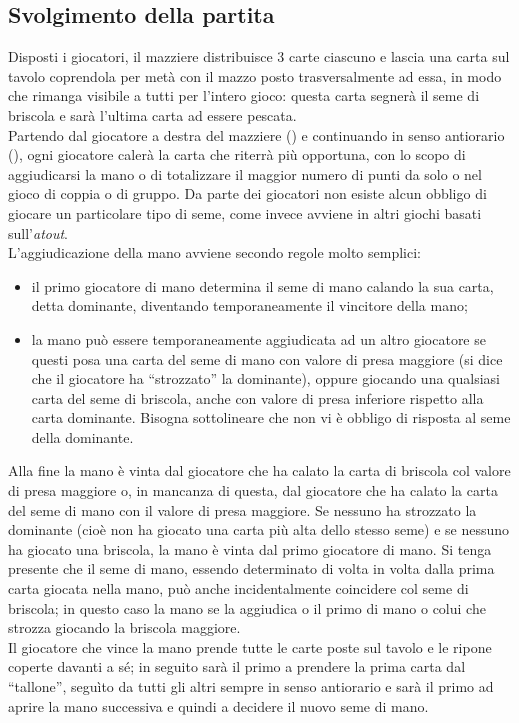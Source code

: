 \subsection{Svolgimento della partita}

Disposti i giocatori, il mazziere distribuisce 3 carte ciascuno e lascia una carta sul tavolo coprendola per metà con il mazzo posto trasversalmente ad essa, in modo che rimanga visibile a tutti per l'intero gioco: questa carta segnerà il seme di briscola e sarà l'ultima carta ad essere pescata.\\
Partendo dal giocatore a destra del mazziere (\cite{giochidicarte}) e continuando in senso antiorario (\cite{giochidicarte2}), ogni giocatore calerà la carta che riterrà più opportuna, con lo scopo di aggiudicarsi la mano o di totalizzare il maggior numero di punti da solo o nel gioco di coppia o di gruppo. Da parte dei giocatori non esiste alcun obbligo di giocare un particolare tipo di seme, come invece avviene in altri giochi basati sull'\emph{atout}.\\

L'aggiudicazione della mano avviene secondo regole molto semplici:

\begin{itemize}
   \item il primo giocatore di mano determina il seme di mano calando la sua carta, detta dominante, diventando temporaneamente il vincitore della mano;
   \item la mano può essere temporaneamente aggiudicata ad un altro giocatore se questi posa una carta del seme di mano con valore di presa maggiore (si dice che il giocatore ha ``strozzato'' la dominante), oppure giocando una qualsiasi carta del seme di briscola, anche con valore di presa inferiore rispetto alla carta dominante. Bisogna sottolineare che non vi è obbligo di risposta al seme della dominante.
\end{itemize}
Alla fine la mano è vinta dal giocatore che ha calato la carta di briscola col valore di presa maggiore o, in mancanza di questa, dal giocatore che ha calato la carta del seme di mano con il valore di presa maggiore. Se nessuno ha strozzato la dominante (cioè non ha giocato una carta più alta dello stesso seme) e se nessuno ha giocato una briscola, la mano è vinta dal primo giocatore di mano. Si tenga presente che il seme di mano, essendo determinato di volta in volta dalla prima carta giocata nella mano, può anche incidentalmente coincidere col seme di briscola; in questo caso la mano se la aggiudica o il primo di mano o colui che strozza giocando la briscola maggiore.\\
Il giocatore che vince la mano prende tutte le carte poste sul tavolo e le ripone coperte davanti a sé; in seguito sarà il primo a prendere la prima carta dal ``tallone'', seguìto da tutti gli altri sempre in senso antiorario e sarà il primo ad aprire la mano successiva e quindi a decidere il nuovo seme di mano.

